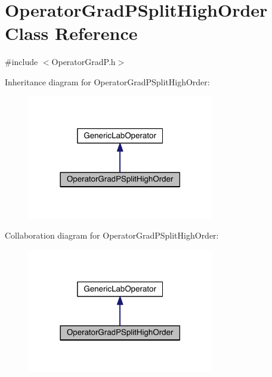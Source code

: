 \hypertarget{class_operator_grad_p_split_high_order}{}\section{Operator\+Grad\+P\+Split\+High\+Order Class Reference}
\label{class_operator_grad_p_split_high_order}


{\ttfamily \#include $<$Operator\+Grad\+P.\+h$>$}



Inheritance diagram for Operator\+Grad\+P\+Split\+High\+Order\+:\nopagebreak
\begin{figure}[H]
\begin{center}
\leavevmode
\includegraphics[width=230pt]{db/d52/class_operator_grad_p_split_high_order__inherit__graph}
\end{center}
\end{figure}


Collaboration diagram for Operator\+Grad\+P\+Split\+High\+Order\+:\nopagebreak
\begin{figure}[H]
\begin{center}
\leavevmode
\includegraphics[width=230pt]{d5/d0d/class_operator_grad_p_split_high_order__coll__graph}
\end{center}
\end{figure}

